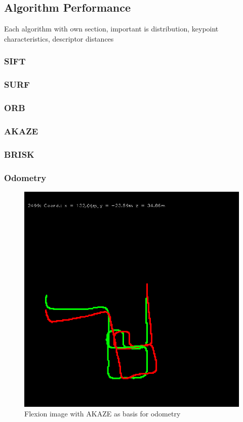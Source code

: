 \subsection{Algorithm Performance}

Each algorithm with own section, important is distribution, keypoint characteristics, descriptor distances

\subsubsection{SIFT}
\subsubsection{SURF}
\subsubsection{ORB}
\subsubsection{AKAZE}
\subsubsection{BRISK}
\subsubsection{Odometry}

\begin{figure}[H]
    \includegraphics[width=0.5\linewidth]{chapter06/odo/jonas_flexion_AKAZE.png}
    \caption{Flexion image with AKAZE as basis for odometry}
\end{figure}
